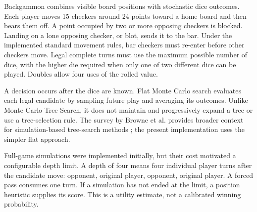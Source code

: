 Backgammon combines visible board positions with stochastic dice outcomes. Each player moves 15 checkers around 24 points toward a home board and then bears them off. A point occupied by two or more opposing checkers is blocked. Landing on a lone opposing checker, or blot, sends it to the bar. Under the implemented standard movement rules, bar checkers must re-enter before other checkers move. Legal complete turns must use the maximum possible number of dice, with the higher die required when only one of two different dice can be played. Doubles allow four uses of the rolled value.

A decision occurs after the dice are known. Flat Monte Carlo search evaluates each legal candidate by sampling future play and averaging its outcomes. Unlike Monte Carlo Tree Search, it does not maintain and progressively expand a tree or use a tree-selection rule. The survey by Browne et al. provides broader context for simulation-based tree-search methods \cite{browne2012}; the present implementation uses the simpler flat approach.

Full-game simulations were implemented initially, but their cost motivated a configurable depth limit. A depth of four means four individual player turns after the candidate move: opponent, original player, opponent, original player. A forced pass consumes one turn. If a simulation has not ended at the limit, a position heuristic supplies its score. This is a utility estimate, not a calibrated winning probability.
